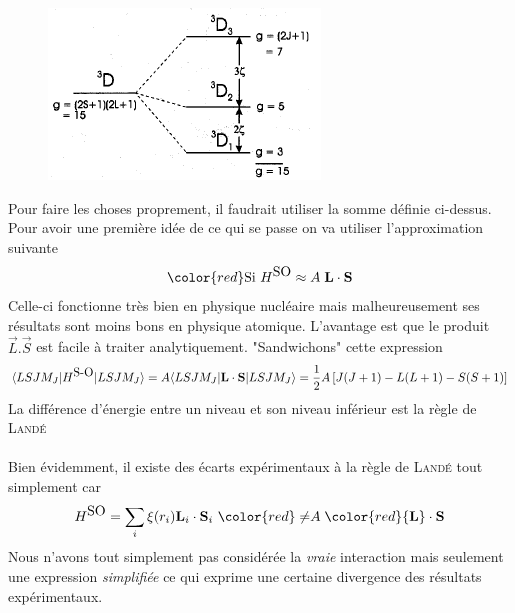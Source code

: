 	\begin{figure}
	\vspace{-7mm}
	\includegraphics[scale=0.65]{ch3/image10}
	\end{figure}

Pour faire les choses proprement, il faudrait utiliser la somme définie ci-dessus. Pour avoir une
première idée de ce qui se passe on va utiliser l'approximation suivante
\begin{equation}
{\color{red} \mbox{Si}~H^{\mbox{SO}} 
\approx A \; {\bf L} \cdot {\bf S} }
\end{equation}
Celle-ci fonctionne très bien en physique nucléaire mais malheureusement ses résultats sont moins
bons en physique atomique. L'avantage est que le produit $\vec{L}.\vec{S}$ est facile à traiter
analytiquement. "Sandwichons" cette expression
\begin{equation}
\langle LSJM_J \vert H^{\mbox{S-O}} \vert LSJM_J \rangle =
A \langle LSJM_J \vert {\bf L} \cdot {\bf S} \vert LSJM_J \rangle = \frac{1}{2} A \left[ J(J+1) -
 L(L+1) - S(S+1) \right]
\end{equation}
La différence d'énergie entre un niveau et son niveau inférieur est la règle de \textsc{Landé}\ \\


	
\ \\

Bien évidemment, il existe des écarts expérimentaux à la règle de \textsc{Landé} tout simplement car
\begin{equation}
H^{\mbox{SO}} = \sum_i \xi(r_i) {\bf L}_i \cdot {\bf S}_i
~ {\color{red} \ne  } A \; {\color{red} {\bf L} \cdot {\bf S}  }
\end{equation}
Nous n'avons tout simplement pas considérée la \textit{vraie} interaction mais seulement une 
expression \textit{simplifiée} ce qui exprime une certaine divergence des résultats expérimentaux.


